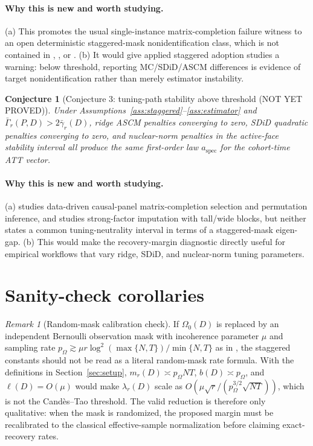 \documentclass[11pt]{article}
\theoremstyle{definition}
\theoremstyle{plain}
\newtheorem{conjecture}{Conjecture}
\theoremstyle{remark}
\newtheorem{remark}{Remark}
\begin{document}
\paragraph{Why this is new and worth studying.}
(a) This promotes the usual single-instance matrix-completion failure witness
to an open deterministic staggered-mask nonidentification class, which is not
contained in \citet[Sections~2--4]{SingerCucuringu2010},
\citet[Theorem~1.3]{Chatterjee2020}, or
\citet[Sections~3--4]{BenMichaelFellerRothstein2022}. (b) It would give applied staggered
adoption studies a warning: below threshold, reporting MC/SDiD/ASCM
differences is evidence of target nonidentification rather than merely
estimator instability.

\begin{conjecture}[Conjecture 3: tuning-path stability above threshold (NOT YET PROVED)]
\label{conj:tuning}
Under Assumptions~\ref{ass:staggered}--\ref{ass:estimator} and
$\bar\Gamma_r(P,D)>2\bar\gamma_r(D)$, ridge ASCM penalties converging to zero,
SDiD quadratic penalties converging to zero, and nuclear-norm penalties in the
active-face stability interval all produce the same first-order law
$a_{\mathrm{spec}}$ for the cohort-time ATT vector.
\end{conjecture}
\paragraph{Why this is new and worth studying.}
(a) \citet[Sections~2--3]{Heiniger2024} studies data-driven causal-panel
matrix-completion selection and permutation inference, and
\citet[Sections~2--4]{BaiNg2021} studies strong-factor imputation with
tall/wide blocks, but neither states a common tuning-neutrality interval in
terms of a staggered-mask eigen-gap. (b) This would make the recovery-margin diagnostic directly useful
for empirical workflows that vary ridge, SDiD, and nuclear-norm tuning
parameters.

\section{Sanity-check corollaries}
\begin{remark}[Random-mask calibration check]\label{cor:random}
If $\Omega_0(D)$ is replaced by an independent Bernoulli observation mask with
incoherence parameter $\mu$ and sampling rate
$p_{\Omega}\gtrsim \mu r\log^2(\max\{N,T\})/\min\{N,T\}$ as in
\citet[Theorems~1--3]{CandesTao2010}, the staggered constants should not be
read as a literal random-mask rate formula. With the definitions in
Section~\ref{sec:setup}, $m_r(D)\asymp p_{\Omega}NT$,
$b(D)\asymp p_{\Omega}$, and $\ell(D)=O(\mu)$ would make
$\lambda_r(D)$ scale as
$O(\mu\sqrt r/(p_{\Omega}^{3/2}\sqrt{NT}))$, which is not the
Cand\`es--Tao threshold. The valid reduction is therefore only qualitative:
when the mask is randomized, the proposed margin must be recalibrated to the
classical effective-sample normalization before claiming exact-recovery rates.
\end{remark}
\end{document}
